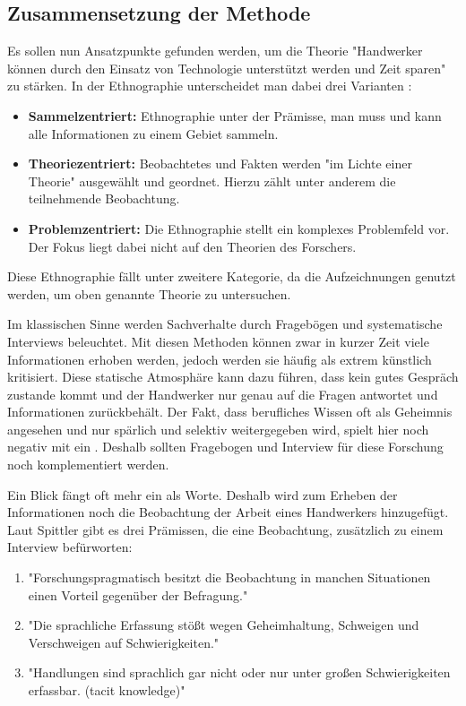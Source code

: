 \subsection{Zusammensetzung der Methode}

Es sollen nun Ansatzpunkte gefunden werden, um die Theorie "Handwerker können durch den Einsatz von Technologie unterstützt werden und Zeit sparen" zu stärken. In der Ethnographie unterscheidet man dabei drei Varianten \cite{spittler_teilnehmende_2001}:

\begin{itemize}
	\item \textbf{Sammelzentriert:} Ethnographie unter der Prämisse, man muss und kann alle Informationen zu einem Gebiet sammeln.
	\item \textbf{Theoriezentriert:} Beobachtetes und Fakten werden "im Lichte einer Theorie" ausgewählt und geordnet. Hierzu zählt unter anderem die teilnehmende Beobachtung.
	\item \textbf{Problemzentriert:} Die Ethnographie stellt ein komplexes Problemfeld vor. Der Fokus liegt dabei nicht auf den Theorien des Forschers.
\end{itemize}

Diese Ethnographie fällt unter zweitere Kategorie, da die Aufzeichnungen genutzt werden, um oben genannte Theorie zu untersuchen. 

Im klassischen Sinne werden Sachverhalte durch Fragebögen und systematische Interviews beleuchtet. Mit diesen Methoden können zwar in kurzer Zeit viele Informationen erhoben werden, jedoch werden sie häufig als extrem künstlich kritisiert. Diese statische Atmosphäre kann dazu führen, dass kein gutes Gespräch zustande kommt und der Handwerker nur genau auf die Fragen antwortet und Informationen zurückbehält. Der Fakt, dass berufliches Wissen oft als Geheimnis angesehen und nur spärlich und selektiv weitergegeben wird, spielt hier noch negativ mit ein \cite{spittler_teilnehmende_2001}. Deshalb sollten Fragebogen und Interview für diese Forschung noch komplementiert werden.

Ein Blick fängt oft mehr ein als Worte. Deshalb wird zum Erheben der Informationen noch die Beobachtung der Arbeit eines Handwerkers hinzugefügt. Laut Spittler \cite{spittler_teilnehmende_2001} gibt es drei Prämissen, die eine Beobachtung, zusätzlich zu einem Interview befürworten:

\begin{enumerate}
	\item "Forschungspragmatisch besitzt die Beobachtung in manchen Situationen einen Vorteil gegenüber der Befragung."
	\item "Die sprachliche Erfassung stößt wegen Geheimhaltung, Schweigen und Verschweigen auf Schwierigkeiten."
	\item "Handlungen sind sprachlich gar nicht oder nur unter großen Schwierigkeiten erfassbar. (tacit knowledge)"
\end{enumerate}

